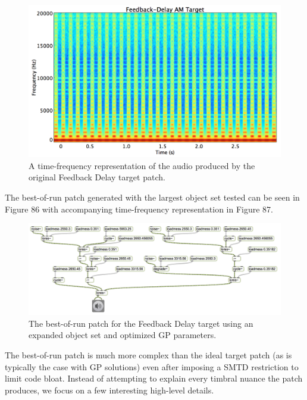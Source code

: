 \documentclass[12pt]{report} 	%
\numberwithin{figure}{chapter}
\numberwithin{table}{chapter}
\numberwithin{equation}{chapter}
\begin{document}
\begin{flushleft}
\begin{figure}[h!]
\begin{center}
\includegraphics[scale=0.35,width=\linewidth]{FeedbackDelayAMTargetSTFT}
\caption[Original feedback delay time-frequency representation]{A time-frequency representation of the audio produced by the original Feedback Delay target patch.}
\end{center}
\vspace{6pt}
\end{figure}

The best-of-run patch generated with the largest object set tested can be seen in Figure 86 with accompanying time-frequency representation in Figure 87.
\begin{figure}[h!]
\begin{center}
\includegraphics[angle=270, scale=0.62]{DelayFeedbackAM_Best}
\caption[Feedback delay best-of-run patch]{The best-of-run patch for the Feedback Delay target using an expanded object set and optimized GP parameters.}
\end{center}
\end{figure}

The best-of-run patch is much more complex than the ideal target patch (as is typically the case with GP solutions) even after imposing a SMTD restriction to limit code bloat. Instead of attempting to explain every timbral nuance the patch produces, we focus on a few interesting high-level details.


\end{flushleft}
\end{document}

